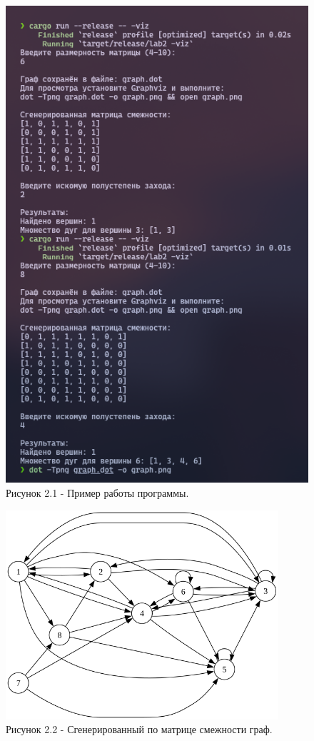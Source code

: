 \documentclass[oneside,a4paper,14pt]{extarticle}
\begin{document}
\clearpage
\begin{figure}[H]
	\centering
	\includegraphics[height=0.9\textheight]{pics/screen.png}
	\caption*{Рисунок 2.1 - Пример работы программы.}
\end{figure}

\clearpage
\begin{figure}[H]
	\centering
	\includegraphics[width=0.9\textwidth]{pics/graph.png}
	\caption*{Рисунок 2.2 - Сгенерированный по матрице смежности граф.}
\end{figure}
\end{document}
